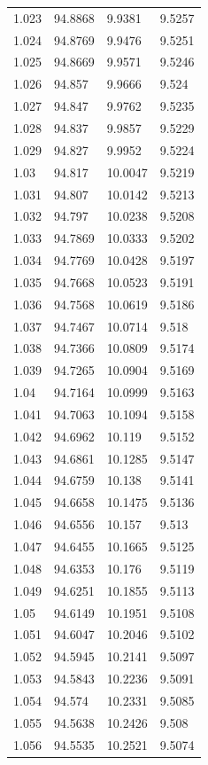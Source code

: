 \begin{tabular}{llll}
1.023 & 94.8868 & 9.9381 & 9.5257 \\
1.024 & 94.8769 & 9.9476 & 9.5251 \\
1.025 & 94.8669 & 9.9571 & 9.5246 \\
1.026 & 94.857 & 9.9666 & 9.524 \\
1.027 & 94.847 & 9.9762 & 9.5235 \\
1.028 & 94.837 & 9.9857 & 9.5229 \\
1.029 & 94.827 & 9.9952 & 9.5224 \\
1.03 & 94.817 & 10.0047 & 9.5219 \\
1.031 & 94.807 & 10.0142 & 9.5213 \\
1.032 & 94.797 & 10.0238 & 9.5208 \\
1.033 & 94.7869 & 10.0333 & 9.5202 \\
1.034 & 94.7769 & 10.0428 & 9.5197 \\
1.035 & 94.7668 & 10.0523 & 9.5191 \\
1.036 & 94.7568 & 10.0619 & 9.5186 \\
1.037 & 94.7467 & 10.0714 & 9.518 \\
1.038 & 94.7366 & 10.0809 & 9.5174 \\
1.039 & 94.7265 & 10.0904 & 9.5169 \\
1.04 & 94.7164 & 10.0999 & 9.5163 \\
1.041 & 94.7063 & 10.1094 & 9.5158 \\
1.042 & 94.6962 & 10.119 & 9.5152 \\
1.043 & 94.6861 & 10.1285 & 9.5147 \\
1.044 & 94.6759 & 10.138 & 9.5141 \\
1.045 & 94.6658 & 10.1475 & 9.5136 \\
1.046 & 94.6556 & 10.157 & 9.513 \\
1.047 & 94.6455 & 10.1665 & 9.5125 \\
1.048 & 94.6353 & 10.176 & 9.5119 \\
1.049 & 94.6251 & 10.1855 & 9.5113 \\
1.05 & 94.6149 & 10.1951 & 9.5108 \\
1.051 & 94.6047 & 10.2046 & 9.5102 \\
1.052 & 94.5945 & 10.2141 & 9.5097 \\
1.053 & 94.5843 & 10.2236 & 9.5091 \\
1.054 & 94.574 & 10.2331 & 9.5085 \\
1.055 & 94.5638 & 10.2426 & 9.508 \\
1.056 & 94.5535 & 10.2521 & 9.5074 \\

\end{tabular}
